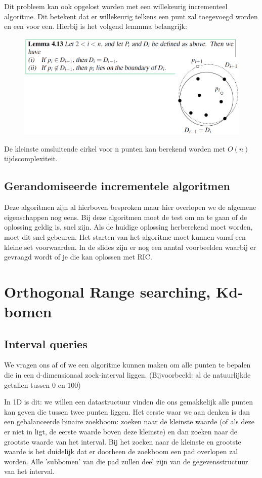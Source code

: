 \documentclass[12pt,a4paper]{article}
\begin{document}
	Dit probleem kan ook opgelost worden met een willekeurig incrementeel algoritme. Dit betekent dat er willekeurig telkens een punt zal toegevoegd worden en een voor een. Hierbij is het volgend lemmma belangrijk: 
	\begin{figure}[H]
		\centering
		\includegraphics[width=0.8\linewidth]{afbeeldingen/cirkel-lemma}
		\label{fig:cirkel-lemma}
	\end{figure}
	
	De kleinste omsluitende cirkel voor n punten kan berekend worden met $O(n)$ tijdscomplexiteit. 
	
	
	\subsection{Gerandomiseerde incrementele algoritmen}
	Deze algoritmen zijn al hierboven besproken maar hier overlopen we de algemene eigenschappen nog eens. Bij deze algoritmen moet de test om na te gaan of de oplossing geldig is, snel zijn. Als de huidige oplossing herberekend moet worden, moet dit snel gebeuren. Het starten van het algoritme moet kunnen vanaf een kleine set voorwaarden. In de slides zijn er nog een aantal voorbeelden waarbij er gevraagd wordt of je die kan oplossen met RIC. 
	
	
	\section{Orthogonal Range searching, Kd-bomen}
	\subsection{Interval queries}
	We vragen ons af of we een algoritme kunnen maken om alle punten te bepalen die in een d-dimensionaal zoek-interval liggen. (Bijvoorbeeld: al de natuurlijkde getallen tussen 0 en 100)
	
	In 1D is dit: we willen een datastructuur vinden die ons gemakkelijk alle punten kan geven die tussen twee punten liggen. Het eerste waar we aan denken is dan een gebalanceerde binaire zoekboom: zoeken naar de kleinste waarde (of als deze er niet in ligt, de eerste waarde boven deze kleinste) en dan zoeken naar de grootste waarde van het interval. Bij het zoeken naar de kleinste en grootste waarde is het duidelijk dat er doorheen de zoekboom een pad overlopen zal worden. Alle 'subbomen' van die pad zullen deel zijn van de gegevensstructuur van het interval. 
	
\end{document}
